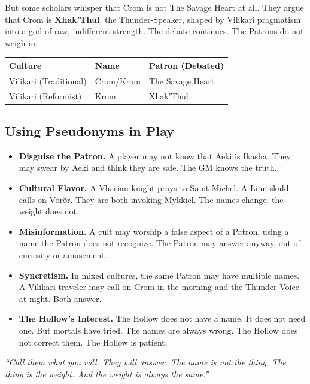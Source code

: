 But some scholars whisper that Crom is not The Savage Heart at all. They argue that Crom is \textbf{Xhak'Thul}, the Thunder-Speaker, shaped by Vilikari pragmatism into a god of raw, indifferent strength. The debate continues. The Patrons do not weigh in.

\begin{center}
\begin{tabular}{p{3cm}|p{4cm}|p{4cm}}
\toprule
\textbf{Culture} & \textbf{Name} & \textbf{Patron (Debated)} \\
\midrule
Vilikari (Traditional) & Crom/Krom & The Savage Heart \\
Vilikari (Reformist) & Krom & Xhak'Thul \\
\bottomrule
\end{tabular}
\end{center}

\subsection{Using Pseudonyms in Play}

\begin{itemize}
  \item \textbf{Disguise the Patron.} A player may not know that Aeki is Ikasha. They may swear by Aeki and think they are safe. The GM knows the truth.
  \item \textbf{Cultural Flavor.} A Vhasian knight prays to Saint Michel. A Linn skald calls on Vörðr. They are both invoking Mykkiel. The names change; the weight does not.
  \item \textbf{Misinformation.} A cult may worship a false aspect of a Patron, using a name the Patron does not recognize. The Patron may answer anyway, out of curiosity or amusement.
  \item \textbf{Syncretism.} In mixed cultures, the same Patron may have multiple names. A Vilikari traveler may call on Crom in the morning and the Thunder-Voice at night. Both answer.
  \item \textbf{The Hollow's Interest.} The Hollow does not have a name. It does not need one. But mortals have tried. The names are always wrong. The Hollow does not correct them. The Hollow is patient.
\end{itemize}

\begin{tcolorbox}[colback=green!5!white,colframe=green!70!black,title=The Gray Wanderer's Advice,breakable]
\textit{``Call them what you will. They will answer. The name is not the thing. The thing is the weight. And the weight is always the same.''}
\end{tcolorbox}



